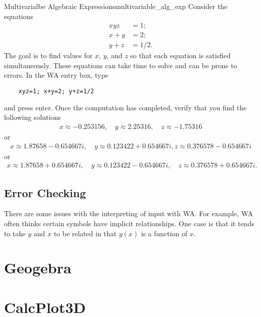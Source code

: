 \begin{ex}{Multivarialbe Algebraic Expressions}{multivariable_alg_exp}
Consider the equations
\begin{align*}
    xyz&=1;\\
    x+y&=2;\\
    y+z&=1/2.
\end{align*}
The goal is to find values for $x$, $y$, and $z$ so that each equation is satisfied simultaneously.  These equations can take time to solve and can be prone to errors.  In the WA entry box, type

\begin{center}
    \begin{BVerbatim}
    xyz=1; x+y=2; y+z=1/2
    \end{BVerbatim}
\end{center}

and press enter.  Once the computation has completed, verify that you find the following solutions
\begin{align*}
    x\approx-0.253156,\quad y\approx2.25316,\quad z\approx-1.75316
\end{align*}
or
\begin{align*}
    x\approx1.87658 - 0.654667 i,\quad y\approx0.123422 + 0.654667 i, z\approx0.376578 - 0.654667 i
\end{align*}
or
\begin{align*}
    x\approx1.87658 + 0.654667 i,\quad y\approx0.123422 - 0.654667 i,\quad z\approx0.376578 + 0.654667 i.
\end{align*}
\end{ex}

\subsection{Error Checking}
There are some issues with the interpreting of input with WA.  For example, WA often thinks certain symbols have implicit relationships.  One case is that it tends to take $y$ and $x$ to be related in that $y(x)$ is a function of $x$.



\section{Geogebra}

\section{CalcPlot3D}